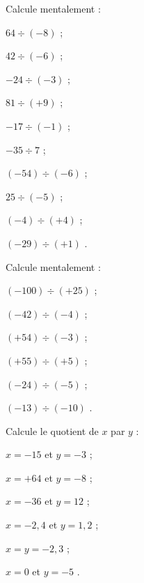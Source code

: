 \begin{exercice}
Calcule mentalement :
\begin{colenumerate}{2}
 \item $64 \div (-8)$  \dotfill;
 \item $42 \div (-6)$  \dotfill;
 \item $-24 \div (-3)$  \dotfill;
 \item $81 \div (+9)$  \dotfill;
 \item $-17 \div (-1)$  \dotfill;
 \item $-35 \div 7$  \dotfill;
 \item $(-54) \div (-6)$  \dotfill;
 \item $25 \div (-5)$  \dotfill;
 \item $(-4) \div (+4)$  \dotfill;
 \item $(-29) \div (+1)$ \dotfill.
 \end{colenumerate}
\end{exercice}


\begin{exercice}
Calcule mentalement :
\begin{colenumerate}{2}
 \item $(-100) \div (+25)$  \dotfill;
 \item $(-42) \div (-4)$  \dotfill;
 \item $(+54) \div (-3)$  \dotfill;
 \item $(+55) \div (+5)$  \dotfill;
 \item $(-24) \div (-5)$  \dotfill;
 \item $(-13)  \div (-10)$ \dotfill.
 \end{colenumerate}
\end{exercice}


\begin{exercice}
Calcule le quotient de $x$ par $y$ :
\begin{colenumerate}{2}
 \item $x = -15$ et $y = -3$  \dotfill;
 \item $x = +64$ et $y = -8$  \dotfill;
 \item $x = -36$ et $y = 12$  \dotfill;
 \item $x = -2,4$ et $y = 1,2$  \dotfill;
 \item $x = y = -2,3$  \dotfill;
 \item $x = 0$ et $y = -5$ \dotfill.
 \end{colenumerate}
\end{exercice}


